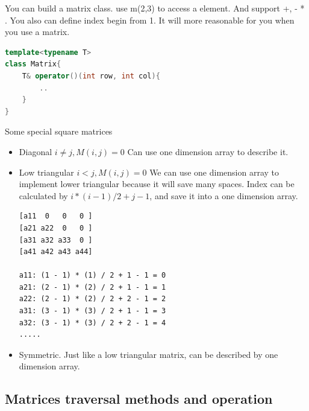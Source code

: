 \documentclass[a4paper,11pt,twoside]{book}
\begin{document}
%	
%	
%	
%	


	\par You can build a matrix class. use m(2,3) to access a element. And support +, - * . You also can define index begin from 1. It will more reasonable for you when you use a matrix. 
\begin{lstlisting}[frame=single, language=c++]
template<typename T>
class Matrix{
	T& operator()(int row, int col){
		..
	}
}	
\end{lstlisting} 


\par  Some special square matrices
\begin{itemize}
	\item Diagonal  $i\neq j, M(i,j) = 0$ Can use one dimension array to describe it. 
	
	\item Low triangular $i<j, M(i,j) = 0$ We can use one dimension array to implement lower triangular because it will save many spaces.  Index can be calculated by $i*(i-1)/2+j-1$, and save it into a one dimension array. 

\begin{lstlisting}
[a11  0   0   0 ]
[a21 a22  0   0 ]
[a31 a32 a33  0 ]
[a41 a42 a43 a44]

a11: (1 - 1) * (1) / 2 + 1 - 1 = 0
a21: (2 - 1) * (2) / 2 + 1 - 1 = 1
a22: (2 - 1) * (2) / 2 + 2 - 1 = 2
a31: (3 - 1) * (3) / 2 + 1 - 1 = 3
a32: (3 - 1) * (3) / 2 + 2 - 1 = 4
.....
\end{lstlisting}
	
	\item Symmetric. Just like a low triangular matrix, can be described by one dimension array. 
\end{itemize}

\subsection{Matrices traversal methods and operation}
	
\end{document}

